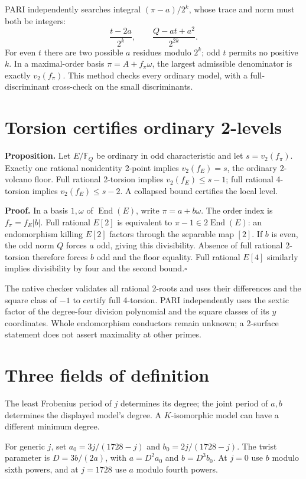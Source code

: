 \documentclass[10pt]{article}
\begin{document}
PARI independently searches integral $(\pi-a)/2^k$, whose trace and norm must both be integers:
\[
\frac{t-2a}{2^k},\qquad \frac{Q-at+a^2}{2^{2k}}.
\]
For even $t$ there are two possible $a$ residues modulo $2^k$; odd $t$ permits no positive $k$. In a maximal-order basis $\pi=A+f_\pi\omega$, the largest admissible denominator is exactly $v_2(f_\pi)$. This method checks every ordinary model, with a full-discriminant cross-check on the small discriminants.
\section{Torsion certifies ordinary 2-levels}
\textbf{Proposition.} Let $E/\mathbb F_Q$ be ordinary in odd characteristic and let $s=v_2(f_\pi)$. Exactly one rational nonidentity 2-point implies $v_2(f_E)=s$, the ordinary 2-volcano floor. Full rational 2-torsion implies $v_2(f_E)\le s-1$; full rational 4-torsion implies $v_2(f_E)\le s-2$. A collapsed bound certifies the local level.

\textbf{Proof.} In a basis $1,\omega$ of $\operatorname{End}(E)$, write $\pi=a+b\omega$. The order index is $f_\pi=f_E|b|$. Full rational $E[2]$ is equivalent to $\pi-1\in2\operatorname{End}(E)$: an endomorphism killing $E[2]$ factors through the separable map $[2]$. If $b$ is even, the odd norm $Q$ forces $a$ odd, giving this divisibility. Absence of full rational 2-torsion therefore forces $b$ odd and the floor equality. Full rational $E[4]$ similarly implies divisibility by four and the second bound.\hfill$\square$

The native checker validates all rational 2-roots and uses their differences and the square class of $-1$ to certify full 4-torsion. PARI independently uses the sextic factor of the degree-four division polynomial and the square classes of its $y$ coordinates. Whole endomorphism conductors remain unknown; a 2-surface statement does not assert maximality at other primes.
\section{Three fields of definition}
The least Frobenius period of $j$ determines its degree; the joint period of $a,b$ determines the displayed model's degree. A $K$-isomorphic model can have a different minimum degree.

For generic $j$, set $a_0=3j/(1728-j)$ and $b_0=2j/(1728-j)$. The twist parameter is $D=3b/(2a)$, with $a=D^2a_0$ and $b=D^3b_0$. At $j=0$ use $b$ modulo sixth powers, and at $j=1728$ use $a$ modulo fourth powers.
\end{document}
